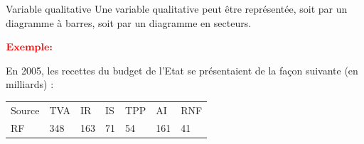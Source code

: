 \documentclass[
  8pt,
  ignorenonframetext,
]{beamer}
\begin{document}
\begin{frame}{Variable qualitative}
Une variable qualitative peut être représentée, soit par un diagramme à
barres, soit par un diagramme en secteurs.\pause

\(\color{red}{\textbf{Exemple:}}\)

En 2005, les recettes du budget de l'Etat se présentaient de la façon
suivante (en milliards) :

\begin{longtable}[]{@{}lllllll@{}}
\toprule
\endhead
Source & TVA & IR & IS & TPP & AI & RNF \\
RF & 348 & 163 & 71 & 54 & 161 & 41 \\
\bottomrule
\end{longtable}

\vspace*{4cm}
\end{frame}
\end{document}
